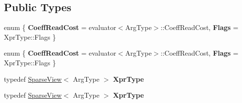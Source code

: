 \subsection*{Public Types}
\begin{DoxyCompactItemize}
\item 
\mbox{\label{struct_eigen_1_1internal_1_1unary__evaluator_3_01_sparse_view_3_01_arg_type_01_4_00_01_index_based_01_4_a8795f16845ca12357770588109e4ff55}} 
enum \{ {\bfseries Coeff\+Read\+Cost} = evaluator$<$Arg\+Type$>$\+:\+:Coeff\+Read\+Cost, 
{\bfseries Flags} = Xpr\+Type\+:\+:Flags
 \}
\item 
\mbox{\label{struct_eigen_1_1internal_1_1unary__evaluator_3_01_sparse_view_3_01_arg_type_01_4_00_01_index_based_01_4_a23aaa988406d425d5722721269775266}} 
enum \{ {\bfseries Coeff\+Read\+Cost} = evaluator$<$Arg\+Type$>$\+:\+:Coeff\+Read\+Cost, 
{\bfseries Flags} = Xpr\+Type\+:\+:Flags
 \}
\item 
\mbox{\label{struct_eigen_1_1internal_1_1unary__evaluator_3_01_sparse_view_3_01_arg_type_01_4_00_01_index_based_01_4_ad2888d8fc55a68579255c23a2ecc9bbd}} 
typedef \hyperlink{group___sparse_core___module_class_eigen_1_1_sparse_view}{Sparse\+View}$<$ Arg\+Type $>$ {\bfseries Xpr\+Type}
\item 
\mbox{\label{struct_eigen_1_1internal_1_1unary__evaluator_3_01_sparse_view_3_01_arg_type_01_4_00_01_index_based_01_4_ad2888d8fc55a68579255c23a2ecc9bbd}} 
typedef \hyperlink{group___sparse_core___module_class_eigen_1_1_sparse_view}{Sparse\+View}$<$ Arg\+Type $>$ {\bfseries Xpr\+Type}
\end{DoxyCompactItemize}
